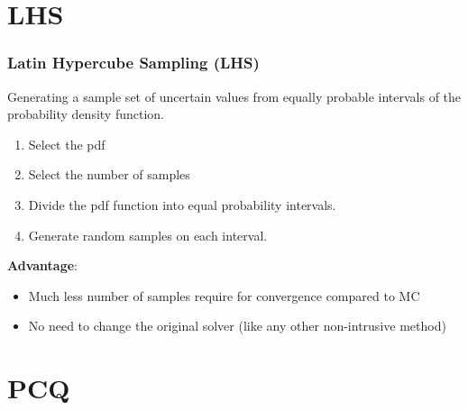 \documentclass[10pt]{beamer}
\begin{document}
\section{LHS}
\begin{frame}
\frametitle{Latin Hypercube Sampling (LHS)}
Generating a sample set of uncertain values from equally probable intervals of the probability density function.\\

\begin{enumerate}
    \item Select the pdf
    \item Select the number of samples
    \item Divide the pdf function into equal probability intervals.
    \item Generate random samples on each interval.
\end{enumerate}
{\bf Advantage}:
\begin{itemize}
    \item Much less number of samples require for convergence compared to MC
    \item No need to change the original solver (like any other non-intrusive method)
\end{itemize}


\end{frame}
\section{PCQ}
\end{document}
